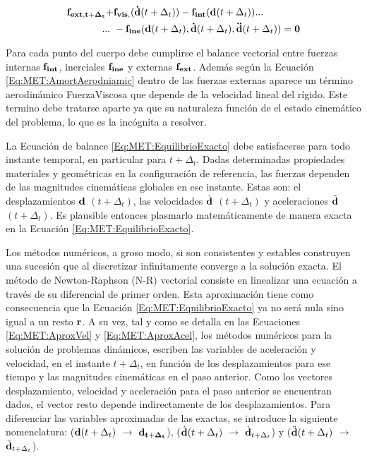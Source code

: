 \begin{equation}\label{Eq:MET:EquilibrioExacto}
	\begin{split}
		\bf{f}_{ext,t+\Delta_t}+&\bf{f}_{vis,}(\dot{\bf{d}}\text{$(t+\Delta_t)$})-\bf{f}_{int}(\bf{d}\text{$(t+\Delta_t)$})...\\
		...~&-\bf{f}_{ine}(\bf{d} \text{$(t+\Delta_t)$},\dot{\bf{d}}\text{$(t+\Delta_t)$},\ddot{\bf{d}}\text{$(t+\Delta_t)$})=0
	\end{split}
\end{equation}
 
Para cada punto del cuerpo debe cumplirse el balance vectorial entre fuerzas internas $\bf{f}_{int}$, inerciales $\bf{f}_{ine}$ y externas $\bf{f}_{ext}$. Además según la Ecuación \eqref{Eq:MET:AmortAerodniamic} dentro de las fuerzas externas aparece un término aerodinámico \gls{FuerzaViscosa} que depende de la velocidad lineal del rígido. Este termino debe tratarse aparte ya que su naturaleza función de el estado cinemático del problema, lo que es la incógnita a resolver.

La Ecuación de balance \eqref{Eq:MET:EquilibrioExacto} debe satisfacerse para todo instante temporal, en particular para $t+\Delta_t$. Dadas determinadas propiedades materiales y geométricas en la configuración de referencia, las fuerzas dependen de las magnitudes cinemáticas globales en ese instante. Estas son: el desplazamientos $\bf{d}$ $(t+\Delta_t)$, las velocidades $\dot{\bf{d}}$ $(t+\Delta_t)$ y aceleraciones $\ddot{\bf{d}}$ $(t+\Delta_t)$. Es plausible entonces plasmarlo matemáticamente de manera exacta en la Ecuación \eqref{Eq:MET:EquilibrioExacto}.


Los métodos numéricos, a groso modo, si son consistentes y estables construyen una sucesión que al discretizar infinitamente converge a la solución exacta. El método de Newton-Raphson (N-R) vectorial consiste en linealizar una ecuación a través de su diferencial de primer orden. Esta aproximación tiene como consecuencia que la Ecuación \eqref{Eq:MET:EquilibrioExacto} ya no será nula sino igual a un resto $\bf{r}$. A su vez, tal y como se detalla en las Ecuaciones \eqref{Eq:MET:AproxVel} y \eqref{Eq:MET:AproxAcel}, los métodos numéricos para la solución de problemas dinámicos, escriben las variables de aceleración y velocidad, en el instante $t +\Delta_t$, en función de los desplazamientos para ese tiempo y las magnitudes cinemáticas en el paso anterior. Como los vectores desplazamiento, velocidad y aceleración para el paso anterior se encuentran dados, el vector resto depende indirectamente de los desplazamientos. Para diferenciar las variables aproximadas de las exactas, se introduce la siguiente nomenclatura: ($\bf{d}\text{$(t+\Delta_t)$}$ $\rightarrow$ $\bf{d}_{t+\Delta_t}$), ($\dot{\bf{d}}\text{$(t+\Delta_t)$}$ $\rightarrow$ $\dot{\bf{d}}_{t+\Delta_t}$) y ($\ddot{\bf{d}}\text{$(t+\Delta_t)$}$ $\rightarrow$ $\ddot{\bf{d}}_{t+\Delta_t}$). 


